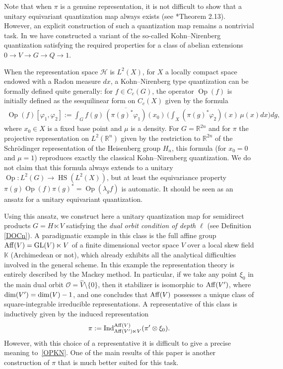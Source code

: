 \documentclass[a4paper,11pt,reqno]{amsart}
\numberwithin{equation}{section}
\theoremstyle{remark}
\theoremstyle{definition}
\newcommand\HS{\operatorname{HS}}
\newcommand\Op{\operatorname{Op}}
\newcommand{\R}{{\mathbb R}}
\newcommand{\CH}{\mathcal H}
\newcommand{\K}{\mathbb K}
\newcommand{\GL}{\operatorname{GL}}
\newcommand{\Ind}{\operatorname{Ind}}
\newcommand{\vf}{\varphi}
\begin{document}
Note that when $\pi$ is a genuine representation, it is not difficult to show that  a unitary equivariant quantization map always exists (see \cite{BGNT3}*{Theorem 2.13}). However, an explicit construction of such a quantization map remains a nontrivial task. In \cites{BGNT3, BGNT4, GM} we have constructed a variant of the so-called Kohn--Nirenberg
quantization satisfying the required properties for a class  of abelian extensions
$
0\to V\to G\to Q\to 1.
$

When the representation space $\CH$ is $L^2(X)$, for $X$ a locally compact space endowed  with
a Radon measure $dx$, a Kohn--Nirenberg type
quantization can be formally defined quite generally: for $f\in C_c(G)$, the operator $\Op(f)$ is initially defined as the sesquilinear  form on $C_c(X)$ given by the formula
\begin{align}
\label{OPKN}
\Op(f)[\vf_1,\vf_2]:=\int_G f(g)\,\overline{(\pi(g)^*\vf_1)}(x_0)  \,\bigg(\int_X (\pi(g)^*\vf_2)(x)\,\mu(x)dx\bigg)dg,
\end{align}
where $x_0\in X$ is a fixed base point and   $\mu$ is a density.
For $G=\R^{2n}$ and for $\pi$  the projective representation on $L^2(\R^n)$ given by the restriction to $\R^{2n}$ of the Schrödinger representation of the
Heisenberg group $H_n$, this formula (for $x_0=0$ and $\mu=1$) reproduces  exactly the classical Kohn--Nirenberg quantization.
We do not claim that this formula always extends to a unitary $\Op\colon L^2(G)\to \HS(L^2(X))$, but at least the equivariance property
$\pi(g)\Op(f)\pi(g)^*=\Op(\lambda_gf)$ is automatic. It should be seen as an ansatz for a unitary equivariant quantization.

\smallskip

Using this ansatz, we construct here a unitary quantization map for semidirect products $G=H\ltimes V$ satisfying the \emph{dual orbit condition of depth $\ell$} (see Definition \ref{DOCn}).
A paradigmatic  example  in this class is the full affine group ${\rm Aff}(V)=\GL(V)\ltimes V$ of a finite dimensional vector space $V$
over a local skew field $\K$ (Archimedean or not), which already exhibits all the analytical difficulties involved in the general scheme.
In this example the representation theory is entirely described by the Mackey method. In particular, if we take any  point  $\xi_0$ in the main dual orbit $\mathcal O=\hat V\setminus\{0\}$, then it stabilizer is isomorphic to ${\rm Aff}(V')$,
where ${\rm dim}(V')={\rm dim}(V)-1$, and one concludes that  ${\rm Aff}(V)$ possesses a unique class of
square-integrable irreducible representations. A representative of this class  is inductively given  by the induced representation
$$
\pi:={\Ind}_{{\rm Aff}(V')\ltimes V}^{{\rm Aff}(V)}(\pi'\otimes \xi_{0}).
$$
However, with this choice of a representative it is difficult to give a precise meaning to~\eqref{OPKN}. One of the main results of this paper is another construction of $\pi$ that is much better suited for this task.
\end{document}
